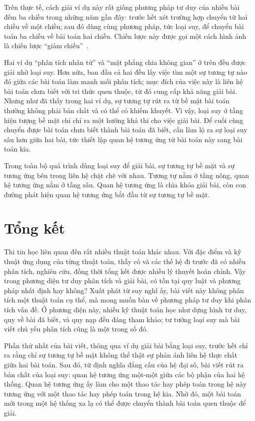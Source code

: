 \documentclass[11pt]{article}
\begin{document}
Trên thực tế, cách giải ví dụ này rất giống phương pháp tư duy của nhiều bài
đếm ba chiều trong những năm gần đây: trước hết xét trường hợp chuyển từ hai
chiều về một chiều; sau đó dùng cùng phương pháp, tức loại suy, để chuyển bài
toán ba chiều về bài toán hai chiều. Chiến lược này được gọi một cách hình ảnh
là chiến lược ``giảm chiều''~\cite{shi}.

Hai ví dụ ``phân tích nhân tử'' và ``mặt phẳng chia không gian'' ở trên đều
được giải nhờ loại suy. Hơn nữa, ban đầu cả hai đều lấy việc tìm một sự tương
tự nào đó giữa các bài toán làm manh mối phân tích; mục đích của việc này là
liên hệ bài toán chưa biết với tri thức quen thuộc, từ đó cung cấp khả năng
giải bài. Nhưng như đã thấy trong hai ví dụ, sự tương tự rút ra từ bề mặt bài
toán thường không phải bản chất và có thể có khiếm khuyết. Vì vậy, loại suy ở
tầng hiện tượng bề mặt chỉ chỉ ra một hướng khả thi cho việc giải bài. Để cuối
cùng chuyển được bài toán chưa biết thành bài toán đã biết, cần làm lộ ra sự
loại suy sâu hơn giữa hai bài, tức thiết lập quan hệ tương ứng từ bài toán này
sang bài toán kia.

Trong toàn bộ quá trình dùng loại suy để giải bài, sự tương tự bề mặt và sự
tương ứng bên trong liên hệ chặt chẽ với nhau. Tương tự nằm ở tầng nông, quan
hệ tương ứng nằm ở tầng sâu. Quan hệ tương ứng là chìa khóa giải bài, còn con
đường phát hiện quan hệ tương ứng bắt đầu từ sự tương tự bề mặt.

\section{Tổng kết}

Thi tin học liên quan đến rất nhiều thuật toán khác nhau. Với đặc điểm và kỹ
thuật ứng dụng của từng thuật toán, thầy cô và các thế hệ đi trước đã có
nhiều phân tích, nghiên cứu, đồng thời tổng kết được nhiều lý thuyết hoàn
chỉnh. Vậy trong phương diện tư duy phân tích và giải bài, có tồn tại quy luật
và phương pháp nhất định hay không? Xuất phát từ suy nghĩ ấy, bài viết này
không phân tích một thuật toán cụ thể, mà mong muốn bàn về phương pháp tư duy
khi phân tích vấn đề. Ở phương diện này, nhiều kỹ thuật toán học như dựng hình
tư duy, quy về bài đã biết, và quy nạp đều đáng tham khảo; tư tưởng loại suy
mà bài viết chủ yếu phân tích cũng là một trong số đó.

Phần thứ nhất của bài viết, thông qua ví dụ giải bài bằng loại suy, trước hết
chỉ ra rằng chỉ sự tương tự bề mặt không thể thật sự phản ánh liên hệ thực
chất giữa hai bài toán. Sau đó, từ định nghĩa đẳng cấu của hệ đại số, bài viết
rút ra bản chất của loại suy: quan hệ tương ứng một-một giữa các bộ phận của
hai hệ thống. Quan hệ tương ứng ấy làm cho một thao tác hay phép toán trong hệ
này tương ứng với một thao tác hay phép toán trong hệ kia. Nhờ đó, một bài
toán mới trong một hệ thống xa lạ có thể được chuyển thành bài toán quen thuộc
để giải.
\end{document}
